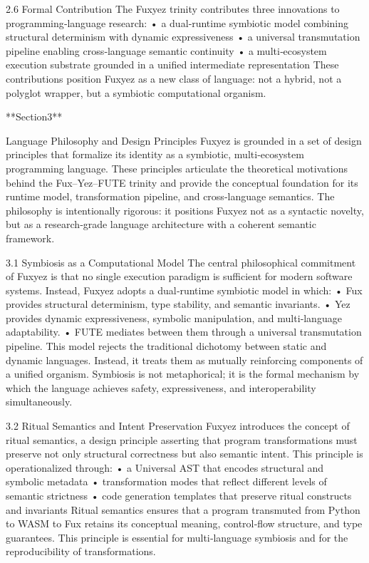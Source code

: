 2.6 Formal Contribution
The Fuxyez trinity contributes three innovations to programming‑language research:
• 	a dual‑runtime symbiotic model combining structural determinism with dynamic expressiveness
• 	a universal transmutation pipeline enabling cross‑language semantic continuity
• 	a multi‑ecosystem execution substrate grounded in a unified intermediate representation
These contributions position Fuxyez as a new class of language: not a hybrid, not a polyglot wrapper, but a symbiotic computational organism.

**Section3**

Language Philosophy and Design Principles
Fuxyez is grounded in a set of design principles that formalize its identity as a symbiotic, multi‑ecosystem programming language. These principles articulate the theoretical motivations behind the Fux–Yez–FUTE trinity and provide the conceptual foundation for its runtime model, transformation pipeline, and cross‑language semantics. The philosophy is intentionally rigorous: it positions Fuxyez not as a syntactic novelty, but as a research‑grade language architecture with a coherent semantic framework.

3.1 Symbiosis as a Computational Model
The central philosophical commitment of Fuxyez is that no single execution paradigm is sufficient for modern software systems. Instead, Fuxyez adopts a dual‑runtime symbiotic model in which:
• 	Fux provides structural determinism, type stability, and semantic invariants.
• 	Yez provides dynamic expressiveness, symbolic manipulation, and multi‑language adaptability.
• 	FUTE mediates between them through a universal transmutation pipeline.
This model rejects the traditional dichotomy between static and dynamic languages. Instead, it treats them as mutually reinforcing components of a unified organism. Symbiosis is not metaphorical; it is the formal mechanism by which the language achieves safety, expressiveness, and interoperability simultaneously.

3.2 Ritual Semantics and Intent Preservation
Fuxyez introduces the concept of ritual semantics, a design principle asserting that program transformations must preserve not only structural correctness but also semantic intent. This principle is operationalized through:
• 	a Universal AST that encodes structural and symbolic metadata
• 	transformation modes that reflect different levels of semantic strictness
• 	code generation templates that preserve ritual constructs and invariants
Ritual semantics ensures that a program transmuted from Python to WASM to Fux retains its conceptual meaning, control‑flow structure, and type guarantees. This principle is essential for multi‑language symbiosis and for the reproducibility of transformations.

